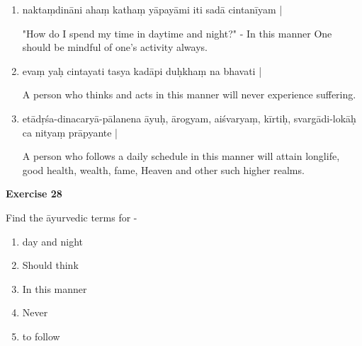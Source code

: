 \begin{enumerate}
\item {}

naktaṃdināni ahaṃ kathaṃ yāpayāmi iti sadā cintanīyam |

"How do I spend my time in daytime and night?" - In this manner One should be mindful of one's activity always. 

\item {}

evaṃ yaḥ cintayati tasya kadāpi duḥkhaṃ na bhavati | 

A person who thinks and acts in this manner will never experience suffering. 

\item {}

etādṛśa-dinacaryā-pālanena āyuḥ, ārogyam, aiśvaryaṃ, kīrtiḥ, svargādi-lokāḥ ca nityaṃ prāpyante |

A person who follows a daily schedule in this manner will attain longlife, good health, wealth, fame, Heaven and other such higher realms.
\end{enumerate}

\begin{center}
\textbf{\large Exercise 28}
\end{center}

Find the āyurvedic terms for -
\begin{enumerate}
\renewcommand{\theenumi}{\alph{enumi}}
\renewcommand{\labelenumi}{\theenumi.}
\item day and night 
\item Should think
\item In this manner 
\item Never
\item to follow
\end{enumerate}
